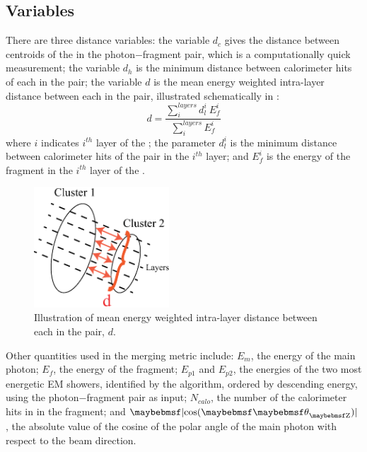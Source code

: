 \subsection{Variables}

There are three distance variables: the variable $d_c$ gives the distance between centroids of the \PFO in the photon$-$fragment pair, which is a computationally quick measurement;  the variable  $d_h$ is the minimum distance between calorimeter hits of each \PFO in the pair;  the variable  $d$ is the mean energy weighted intra-layer distance between  each \PFO in the pair, illustrated schematically in :
\begin{equation}
d = \frac{\sum_{i}^{layers}d_l^i \ E_{f}^i}{\sum_{i}^{layers}E_{f}^i}
\end{equation}
where $i$ indicates $i^{th}$ layer of the \ECAL; the parameter $d_{l}^i$ is the minimum distance between calorimeter hits of the pair in the $i^{th}$ layer; and $E_{f}^i$ is the energy of the fragment in the $i^{th}$ layer of the \ECAL.

\begin{figure}[tbph]
\centering
\includegraphics[width=0.45\textwidth]{photon/dLayer2}
\caption{Illustration of  mean energy weighted intra-layer distance between  each \PFO in the pair, $d$.}
\label{fig:photonDistanceMetric}
\end{figure}

Other quantities used in the merging metric include: $E_m$, the energy of the main photon; $E_f$,  the energy of the fragment; $E_{p1}$ and $E_{p2}$, the energies of the two most energetic EM showers,  identified by the \peakFinding algorithm, ordered by descending energy, using the photon$-$fragment pair as input; $N_{calo}$, the number of the calorimeter  hits in \ECAL in the fragment; and $\absCosTheta$, the absolute value of the cosine of the polar angle of the main photon with respect to the beam direction.


